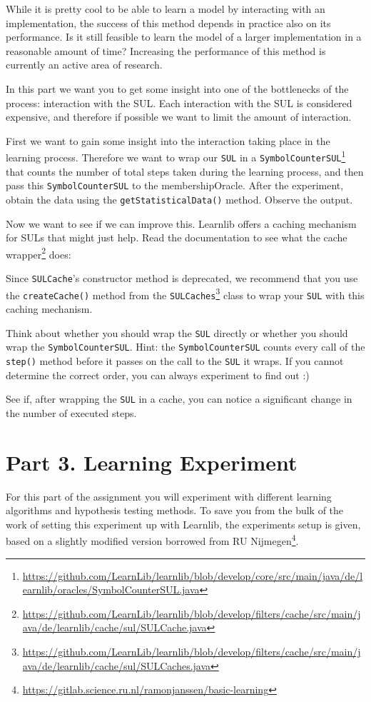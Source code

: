 \documentclass[a4paper]{article}
\begin{document}
While it is pretty cool to be able to learn a model by interacting with an implementation, the success of this method depends in practice also on its performance. Is it still feasible to learn the model of a larger implementation in a reasonable amount of time? Increasing the performance of this method is currently an active area of research.

In this part we want you to get some insight into one of the bottlenecks of the process: interaction with the SUL. Each interaction with the SUL is considered expensive, and therefore if possible we want to limit the amount of interaction.
 
First we want to gain some insight into the interaction taking place in the learning process. Therefore we want to wrap our \texttt{SUL} in a \texttt{SymbolCounterSUL}\footnote{\url{https://github.com/LearnLib/learnlib/blob/develop/core/src/main/java/de/learnlib/oracles/SymbolCounterSUL.java}} that counts the number of total steps taken during the learning process, and then pass this \texttt{SymbolCounterSUL} to the membershipOracle. After the experiment, obtain the data using the \texttt{getStatisticalData()} method. Observe the output.

Now we want to see if we can improve this. Learnlib offers a caching mechanism for SULs that might just help. Read the documentation to see what the cache wrapper\footnote{\url{https://github.com/LearnLib/learnlib/blob/develop/filters/cache/src/main/java/de/learnlib/cache/sul/SULCache.java}} does:


Since \texttt{SULCache}'s constructor method is deprecated, we recommend that you use the \texttt{createCache()} method from the \texttt{SULCaches}\footnote{\url{https://github.com/LearnLib/learnlib/blob/develop/filters/cache/src/main/java/de/learnlib/cache/sul/SULCaches.java}} class to wrap your \texttt{SUL} with this caching mechanism. 


Think about whether you should wrap the \texttt{SUL} directly or whether you should wrap the \texttt{SymbolCounterSUL}. Hint: the \texttt{SymbolCounterSUL} counts every call of the \texttt{step()} method before it passes on the call to the \texttt{SUL} it wraps. If you cannot determine the correct order, you can always experiment to find out :)

See if, after wrapping the \texttt{SUL} in a cache, you can notice a significant change in the number of executed steps.

\section*{Part 3. Learning Experiment}
For this part of the assignment you will experiment with different learning algorithms and hypothesis testing methods. To save you from the bulk of the work of setting this experiment up with Learnlib, the experiments setup is given, based on a slightly modified version borrowed from RU Nijmegen\footnote{\url{https://gitlab.science.ru.nl/ramonjanssen/basic-learning}}. 
\end{document}
